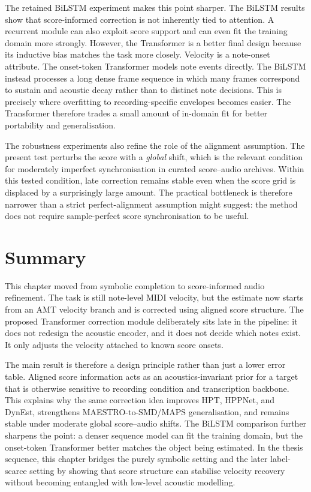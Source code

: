The retained BiLSTM experiment makes this point sharper. The BiLSTM results show that score-informed correction is not inherently tied to attention. A recurrent module can also exploit score support and can even fit the training domain more strongly. However, the Transformer is a better final design because its inductive bias matches the task more closely. Velocity is a note-onset attribute. The onset-token Transformer models note events directly. The BiLSTM instead processes a long dense frame sequence in which many frames correspond to sustain and acoustic decay rather than to distinct note decisions. This is precisely where overfitting to recording-specific envelopes becomes easier. The Transformer therefore trades a small amount of in-domain fit for better portability and generalisation.

The robustness experiments also refine the role of the alignment assumption. The present test perturbs the score with a \emph{global} shift, which is the relevant condition for moderately imperfect synchronisation in curated score--audio archives. Within this tested condition, late correction remains stable even when the score grid is displaced by a surprisingly large amount. The practical bottleneck is therefore narrower than a strict perfect-alignment assumption might suggest: the method does not require sample-perfect score synchronisation to be useful.


\section{Summary}
\label{sec:scoreinf:conclusion}

This chapter moved from symbolic completion to score-informed audio refinement. The task is still note-level MIDI velocity, but the estimate now starts from an AMT velocity branch and is corrected using aligned score structure. The proposed Transformer correction module deliberately sits late in the pipeline: it does not redesign the acoustic encoder, and it does not decide which notes exist. It only adjusts the velocity attached to known score onsets.

The main result is therefore a design principle rather than just a lower error table. Aligned score information acts as an acoustics-invariant prior for a target that is otherwise sensitive to recording condition and transcription backbone. This explains why the same correction idea improves HPT, HPPNet, and DynEst, strengthens MAESTRO-to-SMD/MAPS generalisation, and remains stable under moderate global score--audio shifts. The BiLSTM comparison further sharpens the point: a denser sequence model can fit the training domain, but the onset-token Transformer better matches the object being estimated. In the thesis sequence, this chapter bridges the purely symbolic setting and the later label-scarce setting by showing that score structure can stabilise velocity recovery without becoming entangled with low-level acoustic modelling.